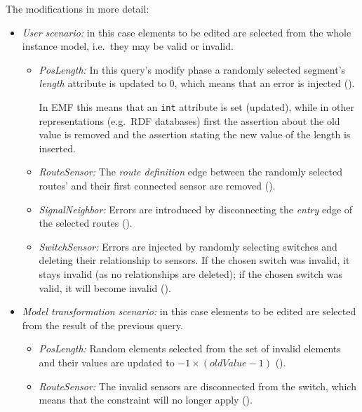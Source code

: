The modifications in more detail:
\begin{itemize}
  \item \emph{User scenario:} in this case elements to be edited are selected from the whole instance model, i.e.\ they may be valid or invalid. 
  \begin{itemize}
    
    \item \emph{PosLength:} In this query's modify phase a randomly selected segment's \emph{length} attribute is updated to 0, which means that an error is injected ().
    
    In EMF this means that an \texttt{int} attribute is set (updated), while in other representations (e.g.\ RDF databases) first the assertion about the old value is removed and the assertion stating the new value of the length is inserted.
    
    \item \emph{RouteSensor:} The \emph{route definition} edge between the randomly selected routes' and their first connected sensor are removed ().
    
    \item \emph{SignalNeighbor:} Errors are introduced by disconnecting the \emph{entry} edge of the selected routes ().

    \item \emph{SwitchSensor:} Errors are injected by randomly selecting switches and deleting their relationship to sensors. If the chosen switch was invalid, it stays invalid (as no relationships are deleted); if the chosen switch was valid, it will become invalid ().
        
  \end{itemize}
  \item \emph{Model transformation scenario:} in this case elements to be edited are selected from the result of the previous query.
  \begin{itemize}
    
    \item \emph{PosLength:} Random elements selected from the set of invalid elements and their values are updated to $-1 \times (\mathit{oldValue}-1)$ ().
    
    \item \emph{RouteSensor:} The invalid sensors are disconnected from the switch, which means that the constraint will no longer apply ().
    

\end{itemize}
\end{itemize}
